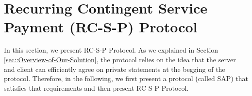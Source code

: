 
\section{Recurring Contingent Service Payment (RC-S-P) Protocol}

In this section, we present RC-S-P Protocol. As we explained in Section \ref{sec::Overview-of-Our-Solution}, the protocol relies on the idea that the server and client can efficiently agree on private statements at the begging of the protocol. Therefore, in the following, we first present a protocol (called SAP) that satisfies that requirements and then present RC-S-P Protocol.





